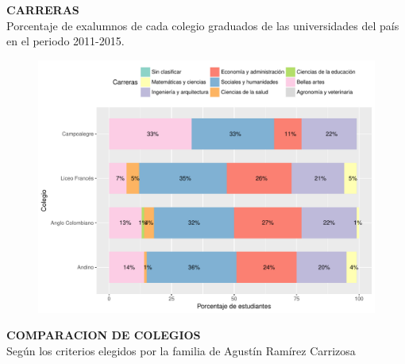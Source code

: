 \documentclass[letterpaper, 12pt]{book}\usepackage[]{graphicx}\usepackage[]{color}
\newenvironment{knitrout}{}{} %
\begin{document}
\newpage
\begin{center}
{\bf\Huge{CARRERAS}}\\
\vspace{0.1cm}
 Porcentaje de exalumnos de cada colegio graduados de las universidades del país en el periodo 2011-2015.
\end{center}
\vspace{2cm}
\begin{center}
\begin{knitrout}
\color{fgcolor}\begin{figure}[H]
\includegraphics[width=.9\linewidth]{figure/graphcarr-1} \caption[ ]{ }\label{fig:graphcarr}
\end{figure}


\end{knitrout}
\end{center}




\newpage
\begin{center}
{\bf\Huge{COMPARACION DE COLEGIOS}}\\
\vspace{0.1cm}
 Según los criterios elegidos por la familia de Agustín Ramírez Carrizosa
\end{center}


\vspace{1cm}
\end{document}
